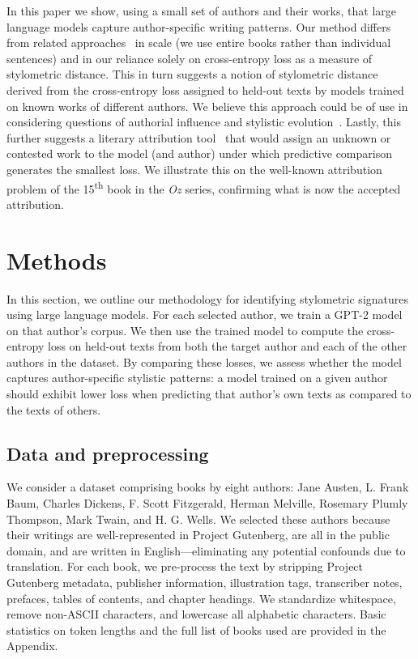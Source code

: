 \documentclass[11pt]{article}
\begin{document}
In this paper we show, using a small set of authors and their works, that large
language models capture author-specific writing patterns. Our method differs
from related approaches~\citep{Reza25} in scale (we use entire books rather
than individual sentences) and in our reliance solely on cross-entropy loss as
a measure of stylometric distance. This in turn suggests a notion of
stylometric distance derived from the cross-entropy loss assigned to held-out
texts by models trained on known works of different authors. We believe this
approach could be of use in considering questions of authorial influence and
stylistic evolution~\citep{HughEtal12}. Lastly, this further suggests a
literary attribution tool~\citep[a common use of stylometric techniques;
][]{MostWall63,MostWall84,NiloBino03,Juol08} that would assign an unknown or
contested work to the model (and author) under which predictive comparison
generates the smallest loss. We illustrate this on the well-known attribution
problem of the 15\textsuperscript{th} book in the \emph{Oz} series, confirming
what is now the accepted attribution.

\section{Methods}

In this section, we outline our methodology for identifying stylometric
signatures using large language models. For each selected author, we train a
GPT-2 model~\citep{RadfEtal19} on that author's corpus. We then use the trained
model to compute the cross-entropy loss on held-out texts from both the target
author and each of the other authors in the dataset. By comparing these losses,
we assess whether the model captures author-specific stylistic patterns: a
model trained on a given author should exhibit lower loss when predicting that
author's own texts as compared to the texts of others.

\subsection{Data and preprocessing \label{sec:data}}

We consider a dataset comprising books by eight authors: Jane Austen, L. Frank
Baum, Charles Dickens, F. Scott Fitzgerald, Herman Melville, Rosemary Plumly
Thompson, Mark Twain, and H. G. Wells. We selected these authors because their
writings are well-represented in Project Gutenberg, are all in the public
domain, and are written in English---eliminating any potential confounds due to
translation. For each book, we pre-process the text by stripping Project
Gutenberg metadata, publisher information, illustration tags, transcriber
notes, prefaces, tables of contents, and chapter headings. We standardize
whitespace, remove non-ASCII characters, and lowercase all alphabetic
characters. Basic statistics on token lengths and the full list of books used
are provided in the Appendix.
\end{document}
